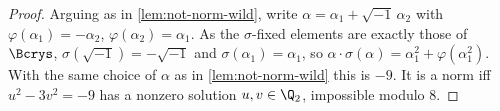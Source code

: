 \begin{proof}
  Arguing as in \cref{lem:not-norm-wild}, write \(\alpha = \alpha_1 +
  \sqrt{-1}\,\alpha_2\) with \(\varphi(\alpha_1) = -\alpha_2\),
  \(\varphi(\alpha_2) = \alpha_1\). As the \(\sigma\)-fixed elements are exactly
  those of \(\Bcrys\), \(\sigma(\sqrt{-1}) = -\sqrt{-1}\) and
  \(\sigma(\alpha_1) = \alpha_1\), so \(\alpha \cdot \sigma(\alpha) = \alpha_1^2
  + \varphi(\alpha_1^2)\). With the same choice of \(\alpha\) as in
  \cref{lem:not-norm-wild} this is \(-9\). It is a norm iff \(u^2 - 3v^2 = -9\)
  has a nonzero solution \(u, v \in \Q_2\), impossible modulo \(8\).
\end{proof}
